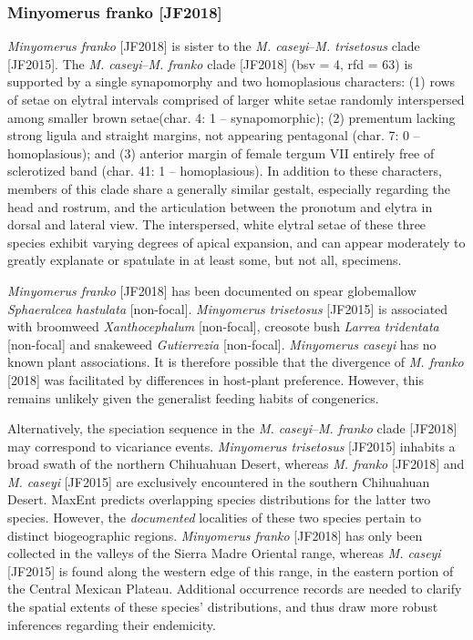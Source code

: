 \documentclass[fleqn,10pt,lineno]{wlpeerj} %
\begin{document}
		\subsubsection*{Minyomerus franko \textnormal{\bfseries[JF2018]}}
			\textit{Minyomerus franko} [JF2018] is sister to the \textit{M. caseyi}--\textit{M. trisetosus} clade [JF2015].
			The \textit{M. caseyi}--\textit{M. franko} clade [JF2018] (bsv = 4, rfd = 63) is supported by a single synapomorphy and two homoplasious characters: (1) rows of setae on elytral intervals comprised of larger white setae randomly interspersed among smaller brown setae(char. 4: 1 -- synapomorphic); (2) prementum lacking strong ligula and straight margins, not appearing pentagonal (char. 7: 0 -- homoplasious); and (3) anterior margin of female tergum VII entirely free of sclerotized band (char. 41: 1 -- homoplasious).
			In addition to these characters, members of this clade share a generally similar gestalt, especially regarding the head and rostrum, and the articulation between the pronotum and elytra in dorsal and lateral view.
			The interspersed, white elytral setae of these three species exhibit varying degrees of apical expansion, and can appear moderately to greatly explanate or spatulate in at least some, but not all, specimens.
			
			\textit{Minyomerus franko} [JF2018] has been documented on spear globemallow \textit{Sphaeralcea hastulata} [non-focal]. \textit{Minyomerus trisetosus} [JF2015] is associated with broomweed \textit{Xanthocephalum} [non-focal], creosote bush \textit{Larrea tridentata} [non-focal] and snakeweed \textit{Gutierrezia} [non-focal]. \textit{Minyomerus caseyi} has no known plant associations.
			It is therefore possible that the divergence of \textit{M. franko} [2018] was facilitated by differences in host-plant preference.
			However, this remains unlikely given the generalist feeding habits of congenerics.
			
			Alternatively, the speciation sequence in the \textit{M. caseyi}--\textit{M. franko} clade [JF2018] may correspond to vicariance events.
			\textit{Minyomerus trisetosus} [JF2015] inhabits a broad swath of the northern Chihuahuan Desert, whereas \textit{M. franko} [JF2018] and \textit{M. caseyi} [JF2015] are exclusively encountered in the southern Chihuahuan Desert.
			MaxEnt predicts overlapping species distributions for the latter two species.
			However, the \emph{documented} localities of these two species pertain to distinct biogeographic regions.
			\textit{Minyomerus franko} [JF2018] has only been collected in the valleys of the Sierra Madre Oriental range, whereas \textit{M. caseyi} [JF2015] is found along the western edge of this range, in the eastern portion of the Central Mexican Plateau.
			Additional occurrence records are needed to clarify the spatial extents of these species' distributions, and thus draw more robust inferences regarding their endemicity.
		
\end{document}
